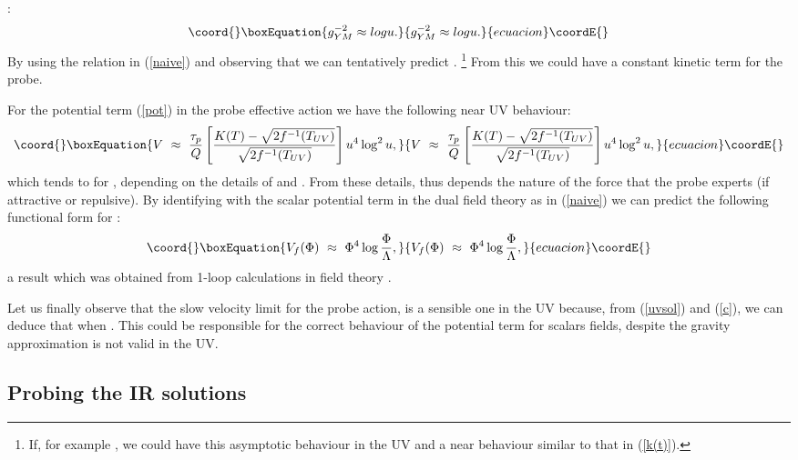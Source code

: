\documentclass[a4paper,12pt]{article}
\begin{document}
\cite{kt1} :
\begin{equation}\coord{}\boxEquation{
g^{-2}_{YM}\approx log u .
}{
g^{-2}_{YM}\approx log u .
}{ecuacion}\coordE{}\end{equation}
By using the relation in (\ref{naive}) and observing that \coordHE{} we can tentatively predict \coordHE{}.
\footnote{If, for example  \coordHE{}, we could have this asymptotic behaviour in the UV and a near \coordHE{} behaviour similar to that in (\ref{k(t)}).}
From this we could have a constant kinetic term for the probe.

For the potential term (\ref{pot}) in the probe effective action we have the following near UV behaviour:
\begin{equation}\coord{}\boxEquation{
V~\approx~ {\tau_{p}\over Q}\left[{{K(T)-\sqrt{2f^{-1}(T_{UV})}}\over\sqrt{2f^{-1}(T_{UV})}}\right] u^4\log^2u,
}{
V~\approx~ {\tau_{p}\over Q}\left[{{K(T)-\sqrt{2f^{-1}(T_{UV})}}\over\sqrt{2f^{-1}(T_{UV})}}\right] u^4\log^2u,
}{ecuacion}\coordE{}\end{equation}
which tends to \myHighlight{$\pm\infty$}\coordHE{} for \coordHE{}, depending on the details of \coordHE{} and \coordHE{}. From these details, thus depends the nature of the force that the probe experts (if attractive or repulsive).
By identifying \coordHE{} with the scalar potential term in the dual field theory as in (\ref{naive}) we can predict the following functional form for \coordHE{}:
\begin{equation}\coord{}\boxEquation{
V_f(\Phi)~\approx~ \Phi^4\log{\Phi\over\Lambda},
}{
V_f(\Phi)~\approx~ \Phi^4\log{\Phi\over\Lambda},
}{ecuacion}\coordE{}\end{equation}
a result which  was obtained from 1-loop calculations in field theory \cite{z}.

Let us finally observe that the slow velocity limit  for the probe action, is a sensible
one in the UV because, from (\ref{uvsol}) and (\ref{c}), we can deduce that \coordHE{} when \coordHE{}. This could be responsible for the correct behaviour of the potential term for scalars fields, despite the gravity approximation is not valid in the UV.


\subsection{Probing the \coordHE{} IR solutions}
\end{document}
